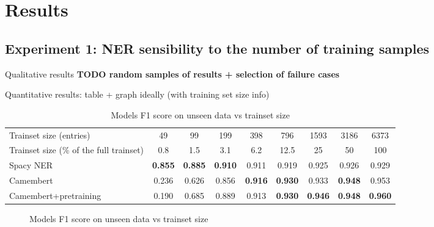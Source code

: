 \section{Results}

\subsection{Experiment 1: NER sensibility to the number of training samples}

Qualitative results
\textbf{TODO random samples of results + selection of failure cases}


Quantitative results: table + graph ideally (with training set size info)

\begin{table}[!h]

\caption{Models F1 score on unseen data vs trainset size}
\centering
\begin{tabular}[t]{lcccccccc}
\toprule
Trainset size (entries) & 49 & 99 & 199 & 398 & 796 & 1593 & 3186 & 6373\\
Trainset size (\% of the full trainset) & 0.8 & 1.5 & 3.1 & 6.2 & 12.5 & 25 & 50 & 100\\
\midrule
Spacy NER & \textbf{0.855} & \textbf{0.885} & \textbf{0.910} & 0.911 & 0.919 & 0.925 & 0.926 & 0.929\\
Camembert & 0.236 & 0.626 & 0.856 & \textbf{0.916} & \textbf{0.930} & 0.933 & \textbf{0.948} & 0.953\\
Camembert+pretraining & 0.190 & 0.685 & 0.889 & 0.913 & \textbf{0.930} & \textbf{0.946} & \textbf{0.948} & \textbf{0.960}\\
\bottomrule
\end{tabular}
\end{table}

\begin{figure}[htb!]
	  \vspace{3in}
	  \caption{\label{fig:f1-vs-trainsize} Models F1 score on unseen data vs trainset size}
\end{figure}
	                                        


